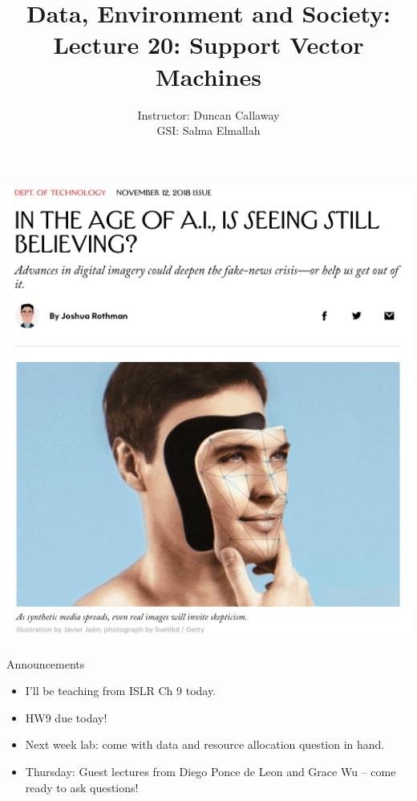 \documentclass[mathserif, aspectratio=169]{beamer}
\title[Lecture 20] %
{Data, Environment and Society: \\{Lecture 20: Support Vector Machines}}
\author[ER131: Data, Environment and Society] 
{Instructor: Duncan Callaway\\
GSI: Salma Elmallah}
\institute[UC Berkeley] %
 {\small{ \bf November 7, 2019}}
\date[November 7, 2019]
\begin{document}
\frame{
  \titlepage
}

\begin{frame}{}
\includegraphics[height=\textheight]{new_yorker}
\end{frame}

\begin{frame}{Announcements}

\begin{itemize}
\item I'll be teaching from ISLR Ch 9 today.
\item HW9 due today!
\item Next week lab: come with data and resource allocation question in hand.
\item Thursday: Guest lectures from Diego Ponce de Leon and Grace Wu -- come ready to ask questions!
\end{itemize}

\end{frame}
\end{document}
